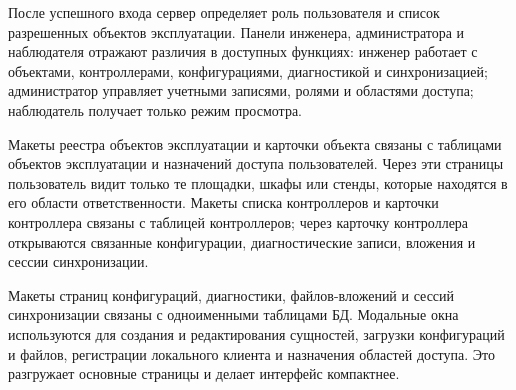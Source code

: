 После успешного входа сервер определяет роль пользователя и список разрешенных объектов эксплуатации. Панели инженера, администратора и наблюдателя отражают различия в доступных функциях: инженер работает с объектами, контроллерами, конфигурациями, диагностикой и синхронизацией; администратор управляет учетными записями, ролями и областями доступа; наблюдатель получает только режим просмотра.

Макеты реестра объектов эксплуатации и карточки объекта связаны с таблицами объектов эксплуатации и назначений доступа пользователей. Через эти страницы пользователь видит только те площадки, шкафы или стенды, которые находятся в его области ответственности. Макеты списка контроллеров и карточки контроллера связаны с таблицей контроллеров; через карточку контроллера открываются связанные конфигурации, диагностические записи, вложения и сессии синхронизации.

Макеты страниц конфигураций, диагностики, файлов-вложений и сессий синхронизации связаны с одноименными таблицами БД. Модальные окна используются для создания и редактирования сущностей, загрузки конфигураций и файлов, регистрации локального клиента и назначения областей доступа. Это разгружает основные страницы и делает интерфейс компактнее.

